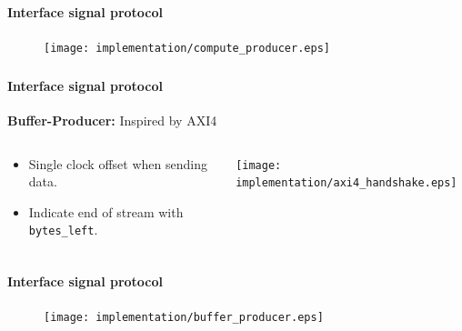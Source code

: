 \begin{frame}[fragile]
\frametitle{\ImplementationTitle}
\framesubtitle{Interface signal protocol}
\begin{figure}
        \centering
        \texttt{[image: implementation/compute\_producer.eps]}
\end{figure}
 
\end{frame}




\begin{frame}[fragile]
    \frametitle{\ImplementationTitle}
    \framesubtitle{Interface signal protocol}
    \textbf{Buffer-Producer:} Inspired by AXI4\\
    \begin{columns}
        \begin{column}{0.4\textwidth}
           \begin{itemize}
               \item Single clock offset when sending data.
               \item Indicate end of stream with \texttt{bytes\_left}.
           \end{itemize}
        \end{column}
        \begin{column}{0.5\textwidth}  %
            \texttt{[image: implementation/axi4\_handshake.eps]}
        \end{column}
    \end{columns}
\end{frame}


\begin{frame}[fragile]
    \frametitle{\ImplementationTitle}
    \framesubtitle{Interface signal protocol}
        \begin{figure}
                \centering
                \texttt{[image: implementation/buffer\_producer.eps]}
       \end{figure}
\end{frame}





